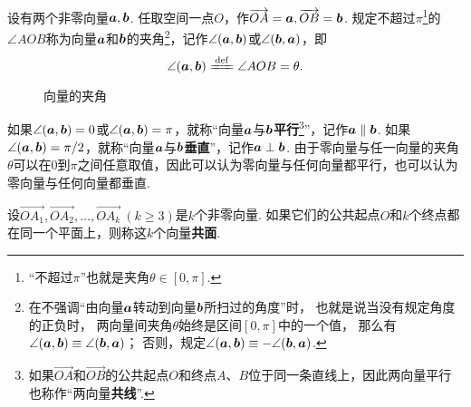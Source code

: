 \begin{definition}
设有两个非零向量\(\boldsymbol{a},\boldsymbol{b}\).
任取空间一点\(O\)，作\(\overrightarrow{OA}=\boldsymbol{a},\overrightarrow{OB}=\boldsymbol{b}\).
规定不超过\(\pi\)\footnote{%
“不超过\(\pi\)”也就是夹角\(\theta \in [0,\pi]\).%
}的\(\angle{AOB}\)称为向量\(\boldsymbol{a}\)和\(\boldsymbol{b}\)的夹角\footnote{%
在不强调“由向量\(\boldsymbol{a}\)转动到向量\(\boldsymbol{b}\)所扫过的角度”时，%
也就是说当没有规定角度的正负时，%
两向量间夹角\(\theta\)始终是区间\([0,\pi]\)中的一个值，%
那么有\(\angle(\boldsymbol{a},\boldsymbol{b}) \equiv \angle(\boldsymbol{b},\boldsymbol{a})\)；%
否则，规定\(\angle(\boldsymbol{a},\boldsymbol{b}) \equiv -\angle(\boldsymbol{b},\boldsymbol{a})\).%
}，记作\(\angle(\boldsymbol{a},\boldsymbol{b})\)或\(\angle(\boldsymbol{b},\boldsymbol{a})\)，即\[
\angle(\mat{a},\mat{b}) \defeq \angle{AOB} = \theta.
\]
\begin{figure}[ht]
\centering
{}
\caption{向量的夹角}
\label{figure:解析几何.向量的夹角}
\end{figure}

如果\(\angle(\boldsymbol{a},\boldsymbol{b}) = 0\)或\(\angle(\boldsymbol{a},\boldsymbol{b}) = \pi\)，就称“向量\(\boldsymbol{a}\)与\(\boldsymbol{b}\)\textbf{平行}\footnote{%
如果\(\vec{OA}\)和\(\vec{OB}\)的公共起点\(O\)和终点\(A\)、\(B\)位于同一条直线上，因此两向量平行也称作“两向量\textbf{共线}”.%
}”，记作\(\boldsymbol{a}\parallel\boldsymbol{b}\).
如果\(\angle(\boldsymbol{a},\boldsymbol{b}) = \pi/2\)，就称“向量\(\boldsymbol{a}\)与\(\boldsymbol{b}\)\textbf{垂直}”，记作\(\boldsymbol{a}\perp\boldsymbol{b}\).
由于零向量与任一向量的夹角\(\theta\)可以在\(0\)到\(\pi\)之间任意取值，因此可以认为零向量与任何向量都平行，也可以认为零向量与任何向量都垂直.
\end{definition}

\begin{definition}
设\(\vec{OA_1},\vec{OA_2},\dotsc,\vec{OA_k}\ (k \geqslant 3)\)是\(k\)个非零向量.
如果它们的公共起点\(O\)和\(k\)个终点都在同一个平面上，则称这\(k\)个向量\textbf{共面}.
\end{definition}

